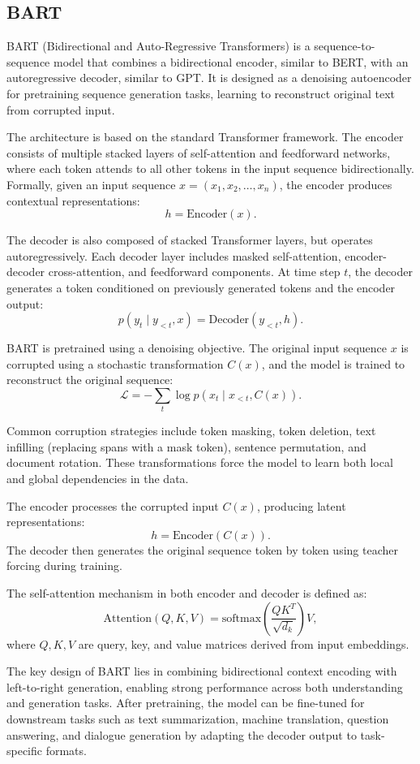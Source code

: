 \documentclass[10pt,a4paper]{article}
\begin{document}
\subsection{BART}
BART (Bidirectional and Auto-Regressive Transformers) is a sequence-to-sequence model that combines a bidirectional encoder, similar to BERT, with an autoregressive decoder, similar to GPT. It is designed as a denoising autoencoder for pretraining sequence generation tasks, learning to reconstruct original text from corrupted input.

The architecture is based on the standard Transformer framework. The encoder consists of multiple stacked layers of self-attention and feedforward networks, where each token attends to all other tokens in the input sequence bidirectionally. Formally, given an input sequence \(x = (x_1, x_2, \dots, x_n)\), the encoder produces contextual representations:
\[
h = \text{Encoder}(x).
\]

The decoder is also composed of stacked Transformer layers, but operates autoregressively. Each decoder layer includes masked self-attention, encoder-decoder cross-attention, and feedforward components. At time step \(t\), the decoder generates a token conditioned on previously generated tokens and the encoder output:
\[
p(y_t \mid y_{<t}, x) = \text{Decoder}(y_{<t}, h).
\]

BART is pretrained using a denoising objective. The original input sequence \(x\) is corrupted using a stochastic transformation \(C(x)\), and the model is trained to reconstruct the original sequence:
\[
\mathcal{L} = - \sum_{t} \log p(x_t \mid x_{<t}, C(x)).
\]

Common corruption strategies include token masking, token deletion, text infilling (replacing spans with a mask token), sentence permutation, and document rotation. These transformations force the model to learn both local and global dependencies in the data.

The encoder processes the corrupted input \(C(x)\), producing latent representations:
\[
h = \text{Encoder}(C(x)).
\]
The decoder then generates the original sequence token by token using teacher forcing during training.

The self-attention mechanism in both encoder and decoder is defined as:
\[
\text{Attention}(Q,K,V) = \text{softmax}\left(\frac{QK^T}{\sqrt{d_k}}\right)V,
\]
where \(Q, K, V\) are query, key, and value matrices derived from input embeddings.

The key design of BART lies in combining bidirectional context encoding with left-to-right generation, enabling strong performance across both understanding and generation tasks. After pretraining, the model can be fine-tuned for downstream tasks such as text summarization, machine translation, question answering, and dialogue generation by adapting the decoder output to task-specific formats.
\end{document}
